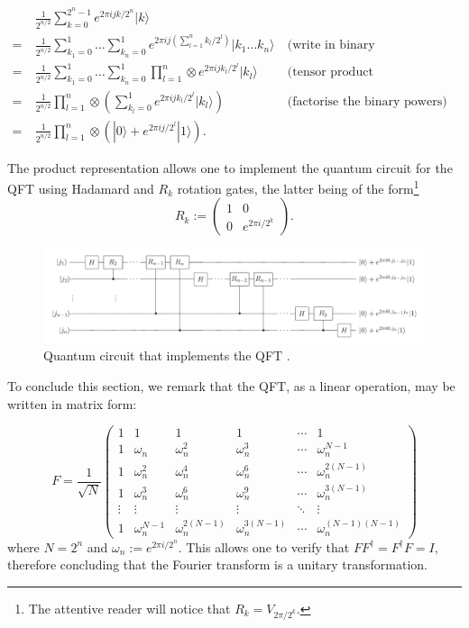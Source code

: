 \documentclass[a4paper, 10pt]{article}
\numberwithin{equation}{section}
\numberwithin{figure}{section}
\numberwithin{table}{section}
\begin{document}
\begin{align*}
	&\frac{1}{2^{n/2}}\sum_{k=0}^{2^n-1}e^{2\pi ijk/2^n}|k\rangle\\
	=\ &\frac{1}{2^{n/2}}\sum_{k_1=0}^{1}\dots\sum_{k_n=0}^{1}e^{2\pi ij(\sum_{l=1}^{n}k_l/2^{l})}|k_1\dots k_n\rangle \ &\text{(write in binary representation)}\\
	=\ &\frac{1}{2^{n/2}}\sum_{k_1=0}^{1}\dots\sum_{k_n=0}^{1}\prod_{l=1}^{n}\otimes e^{2\pi ijk_l/2^l}|k_l\rangle\ &\text{(tensor product decomposition)}\\
	=\ &\frac{1}{2^{n/2}}\prod_{l=1}^{n}\otimes\left( \sum_{k_l=0}^{1} e^{2\pi ijk_l/2^l}|k_l\rangle \right)\ &\text{(factorise the binary powers)}\\
	=\ &\frac{1}{2^{n/2}}\prod_{l=1}^{n}\otimes\left( |0\rangle + e^{2\pi ij/2^l} |1\rangle \right).
\end{align*}

The product representation allows one to implement the quantum circuit for the QFT using Hadamard and $R_k$ rotation gates, the latter being of the form\footnote{The attentive reader will notice that $R_k = V_{2\pi/2^k}$.}
\begin{equation}
	R_k := \begin{pmatrix}1 & 0\\ 0 & e^{2\pi i/2^k}\end{pmatrix}.
\end{equation}

\begin{figure}[h!]
	\centering
	\includegraphics[width=12cm]{Figures/qft-circuit}
	\caption{Quantum circuit that implements the QFT \cite{nielsen}.}
	\label{fig-qft}
\end{figure}

To conclude this section, we remark that the QFT, as a linear operation, may be written in matrix form\cite{wiki}:

\begin{equation}
	 F = \frac{1}{\sqrt{N}}
	\begin{pmatrix}
	1 & 1 & 1 & 1 & \cdots & 1 \\
	1 & \omega_n & \omega_n^2 & \omega_n^3 & \cdots & \omega_n^{N-1} \\
	1&\omega_n^2&\omega_n^4&\omega_n^6&\cdots&\omega_n^{2(N-1)}\\ 1&\omega_n^3&\omega_n^6&\omega_n^9&\cdots&\omega_n^{3(N-1)}\\
	\vdots&\vdots&\vdots&\vdots&\ddots&\vdots\\
	1&\omega_n^{N-1}&\omega_n^{2(N-1)}&\omega_n^{3(N-1)}&\cdots&\omega_n^{(N-1)(N-1)}
	\end{pmatrix}
\end{equation}
where $N=2^n$ and $\omega_n:=e^{2\pi i/2^n}$. This allows one to verify that $FF^{\dagger} = F^{\dagger}F = I$, therefore concluding that the Fourier transform is a unitary transformation.
\end{document}
